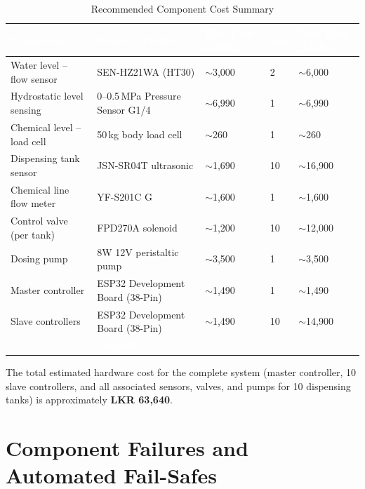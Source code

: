 \documentclass[12pt,a4paper]{article}
\begin{document}
\begin{table}[H]
\centering
\setlength{\tabcolsep}{6pt}
\renewcommand{\arraystretch}{1.4}
\begin{tabular}{|p{4cm}|p{4.5cm}|p{2cm}|p{1.5cm}|p{2cm}|}
\hline
\rowcolor{headerblue}
\textcolor{white}{\textbf{Subsystem}} &
\textcolor{white}{\textbf{Selected Product}} &
\textcolor{white}{\textbf{Unit Cost (LKR)}} &
\textcolor{white}{\textbf{Qty}} &
\textcolor{white}{\textbf{Line Total (LKR)}} \\
\hline
\rowcolor{rowgray}
Water level -- flow sensor & SEN-HZ21WA (HT30) & $\sim$3,000 & 2 & $\sim$6,000 \\
\hline
Hydrostatic level sensing & 0--0.5\,MPa Pressure Sensor G1/4 & $\sim$6,990 & 1 & $\sim$6,990 \\
\hline
\rowcolor{rowgray}
Chemical level -- load cell & 50\,kg body load cell & $\sim$260 & 1 & $\sim$260 \\
\hline
Dispensing tank sensor & JSN-SR04T ultrasonic & $\sim$1,690 & 10 & $\sim$16,900 \\
\hline
\rowcolor{rowgray}
Chemical line flow meter & YF-S201C G\textonehalf{} & $\sim$1,600 & 1 & $\sim$1,600 \\
\hline
Control valve (per tank) & FPD270A solenoid & $\sim$1,200 & 10 & $\sim$12,000 \\
\hline
\rowcolor{rowgray}
Dosing pump & 8W 12V peristaltic pump & $\sim$3,500 & 1 & $\sim$3,500 \\
\hline
Master controller & ESP32 Development Board (38-Pin) & $\sim$1,490 & 1 & $\sim$1,490 \\
\hline
\rowcolor{rowgray}
Slave controllers & ESP32 Development Board (38-Pin) & $\sim$1,490 & 10 & $\sim$14,900 \\
\hline
\rowcolor{headerblue}
\multicolumn{4}{|l|}{\textcolor{white}{\textbf{Total Estimated Hardware Cost}}} &
\textcolor{white}{\textbf{$\sim$63,640}} \\
\hline
\end{tabular}
\caption{Recommended Component Cost Summary}
\label{tab:cost_summary}
\end{table}

\noindent The total estimated hardware cost for the complete system (master controller, 10 slave controllers, and all associated sensors, valves, and pumps for 10 dispensing tanks) is approximately \textbf{LKR 63,640}.

\newpage
\section{Component Failures and Automated Fail-Safes}
\end{document}
